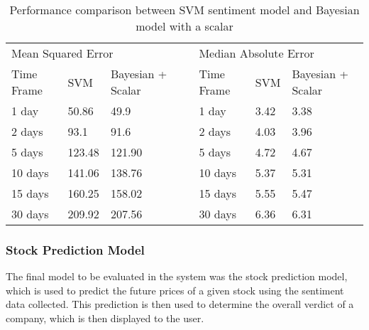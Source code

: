             \begin{table}[h]
            \caption{Performance comparison between SVM sentiment model and Bayesian model with a scalar}
            \label{Table: pred_sent_final}
            \centering
            \begin{tabular}{|l|l|l|l|l|l|l|}
            \multicolumn{3}{l}{Mean Squared Error}                                                                         & \multicolumn{1}{l}{} & \multicolumn{3}{l}{Median Absolute Error}  \\ 
            \cline{1-3}\cline{5-7}
            Time Frame                                                                           & SVM    & Bayesian + Scalar &                      & Time Frame & SVM  & Bayesian + Scalar         \\ 
            \cline{1-3}\cline{5-7}
            {1 day}                                             & 50.86  & 49.9           &                      & 1 day      & 3.42 & 3.38                   \\ 
            \cline{1-3}\cline{5-7}
            {2 days}                                            & 93.1   & 91.6           &                      & 2 days     & 4.03 & 3.96                   \\ 
            \cline{1-3}\cline{5-7}
            {5 days}                                            & 123.48 & 121.90         &                      & 5 days     & 4.72 & 4.67                   \\ 
            \cline{1-3}\cline{5-7}
            {10 days} & 141.06 & 138.76         &                      & 10 days    & 5.37 & 5.31                   \\ 
            \cline{1-3}\cline{5-7}
            15 days                                                                              & 160.25 & 158.02         &                      & 15 days    & 5.55 & 5.47                   \\ 
            \cline{1-3}\cline{5-7}
            30 days                                                                              & 209.92 & 207.56         &                      & 30 days    & 6.36 & 6.31                   \\
            \cline{1-3}\cline{5-7}
            \end{tabular}
            \end{table}
        
            
        \subsubsection{Stock Prediction Model}
        The final model to be evaluated in the system was the stock prediction model, which is used to predict the future prices of a given stock using the sentiment data collected. This prediction is then used to determine the overall verdict of a company, which is then displayed to the user.
        
